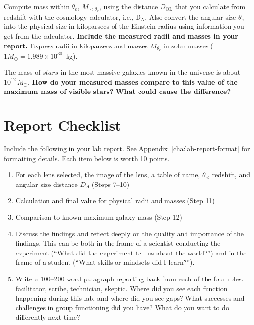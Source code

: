 \begin{steps}
	\item Compute mass within $\theta_e$, $M_{<\theta_e}$, using the distance $D_\textrm{OL}$
	that you calculate from redshift with the cosmology calculator,
	i.e., D$_\textrm{A}$. Also convert the angular size $\theta_e$ into the physical
	size in kiloparsecs of the Einstein radius using information you get from the
	calculator. \textbf{Include the measured radii and masses in your
	report.} Express radii in kiloparsecs and masses $M_{\theta_e}$ in
	solar masses ($1M_{\odot}=1.989\times 10^{30}$~kg).
	
	\item The mass of $stars$ in the most massive galaxies known in the
	universe is about $10^{12}\,M_{\odot}$. \textbf{How do your measured masses
	compare to this value of the maximum mass of visible stars? What
	could cause the difference?}
	
\end{steps}

%

\section{Report Checklist}

Include the following in your lab report. See Appendix~\ref{cha:lab-report-format} for formatting details. Each item below is worth 10 points.

\begin{enumerate}
	\item For each lens selected, the image of the lens, a table of name, $\theta_e$, redshift, and angular size distance $D_A$ (Steps 7--10)
	
	\item Calculation and final value for physical radii and masses (Step 11)
	
	\item Comparison to known maximum galaxy mass (Step 12)
	
	\item Discuss the findings and reflect deeply on the quality and importance of the findings. This can
	be both in the frame of a scientist conducting the experiment (“What did the experiment tell us
	about the world?”) and in the frame of a student (“What skills or mindsets did I learn?”).
	
	\item Write a 100--200 word paragraph reporting back from each of the four roles: facilitator, scribe, technician, skeptic. Where did you see each function happening during this lab, and where did you see gaps? What successes and challenges in group functioning did you have? What do you want to do differently next time?
\end{enumerate}